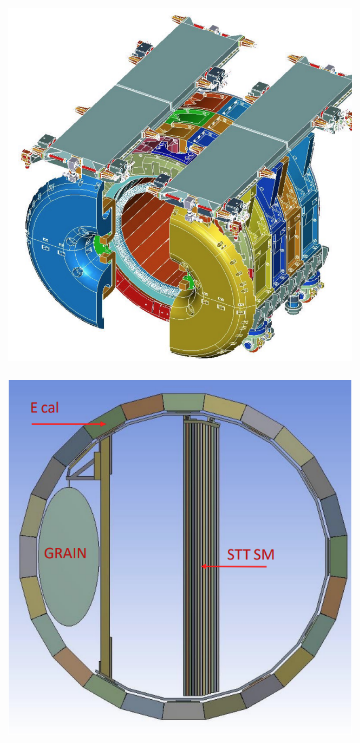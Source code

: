 \begin{figure}[t]
     \centering
     \begin{subfigure}[b]{0.5\textwidth}
         \centering
         \includegraphics[width=\textwidth]{figures/ch3-DUNE/SAND.png}
         \caption{}
         \label{fig:SAND-outside}
     \end{subfigure}
     \hfill
     \begin{subfigure}[b]{0.48\textwidth}
         \centering
         \includegraphics[width=\textwidth]{figures/ch3-DUNE/SAND-inside.png}

\end{subfigure}
\end{figure}
